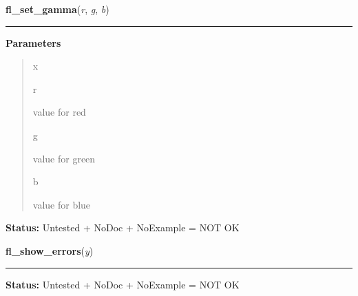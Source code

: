\hspace{.8\funcindent}\begin{boxedminipage}{\funcwidth}

    \raggedright \textbf{fl\_set\_gamma}(\textit{r}, \textit{g}, \textit{b})

    \vspace{-1.5ex}

    \rule{\textwidth}{0.5\fboxrule}
\setlength{\parskip}{2ex}
\setlength{\parskip}{1ex}
      \textbf{Parameters}
      \vspace{-1ex}

      \begin{quote}
        \begin{Ventry}{x}

          \item[r]

          value for red

          \item[g]

          value for green

          \item[b]

          value for blue

        \end{Ventry}

      \end{quote}

\textbf{Status:} Untested + NoDoc + NoExample = NOT OK



    \end{boxedminipage}

    \label{xformslib:library:fl_show_errors}

    \vspace{0.5ex}

\hspace{.8\funcindent}\begin{boxedminipage}{\funcwidth}

    \raggedright \textbf{fl\_show\_errors}(\textit{y})

    \vspace{-1.5ex}

    \rule{\textwidth}{0.5\fboxrule}
\setlength{\parskip}{2ex}
\setlength{\parskip}{1ex}
\textbf{Status:} Untested + NoDoc + NoExample = NOT OK



    \end{boxedminipage}

